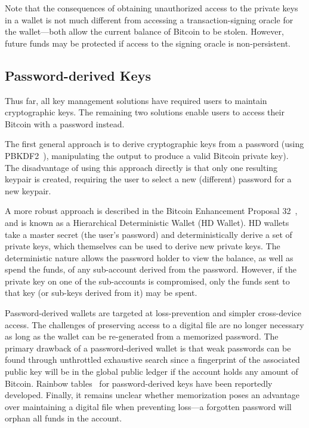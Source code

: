 Note that the consequences of obtaining unauthorized access to the private keys in a wallet is not much different from accessing a transaction-signing oracle for the wallet---both allow the current balance of Bitcoin to be stolen. However, future funds may be protected if access to the signing oracle is non-persistent. 


\subsection{Password-derived Keys} 
Thus far, all key management solutions have required users to maintain cryptographic keys. The remaining two solutions enable users to access their Bitcoin with a password instead. 

The first general approach is to derive cryptographic keys from a password (\eg using PBKDF2~\cite{pbkdf2}), manipulating the output to produce a valid Bitcoin private key). The disadvantage of using this approach directly is that only one resulting keypair is created, requiring the user to select a new (different) password for a new keypair. 

A more robust approach is described in the Bitcoin Enhancement Proposal 32~\cite{bip32}, and is known as a Hierarchical Deterministic Wallet (HD Wallet). HD wallets take a master secret (the user's password) and deterministically derive a set of private keys, which themselves can be used to derive new private keys. The deterministic nature allows the password holder to view the balance, as well as spend the funds, of any sub-account derived from the password. However, if the private key on one of the sub-accounts is compromised, only the funds sent to that key (or sub-keys derived from it) may be spent. 


Password-derived wallets are targeted at loss-prevention and simpler cross-device access. The challenges of preserving access to a digital file are no longer necessary as long as the wallet can be re-generated from a memorized password. The primary drawback of a password-derived wallet is that weak passwords can be found through unthrottled exhaustive search since a fingerprint of the associated public key will be in the global public ledger if the account holds any amount of Bitcoin. Rainbow tables~\cite{oechslin2003making} for password-derived keys have been reportedly developed. Finally, it remains unclear whether memorization poses an advantage over maintaining a digital file when preventing loss---a forgotten password will orphan all funds in the account.


